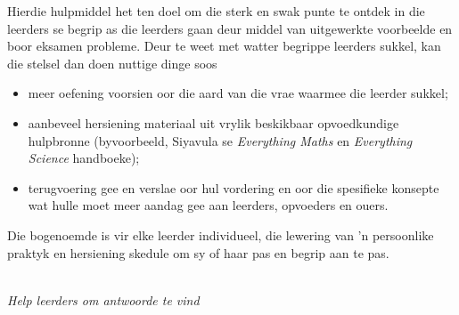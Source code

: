 {%
Hierdie hulpmiddel het ten doel om die sterk en swak punte te ontdek in die leerders se begrip as die leerders gaan deur middel van uitgewerkte voorbeelde en boor eksamen probleme. Deur te weet met watter begrippe leerders sukkel, kan die stelsel dan doen nuttige dinge soos 
\begin{itemize}[noitemsep]
\item meer oefening voorsien oor die aard van die vrae waarmee die leerder sukkel;
\item aanbeveel hersiening materiaal uit vrylik beskikbaar opvoedkundige hulpbronne (byvoorbeeld,  Siyavula se \textit{Everything Maths} en \textit{Everything Science} handboeke);

\item terugvoering gee en verslae oor hul vordering en oor die spesifieke konsepte wat hulle moet meer aandag gee aan leerders, opvoeders en ouers. 
\end{itemize}
Die bogenoemde is vir elke leerder individueel, die lewering van 'n persoonlike praktyk en hersiening skedule om sy of haar pas en begrip aan te pas. 





\vspace*{1cm}
}
\\
{\normalfont\sffamily\fontsize{22}\normalfont\itshape Help leerders om antwoorde te vind} \par

